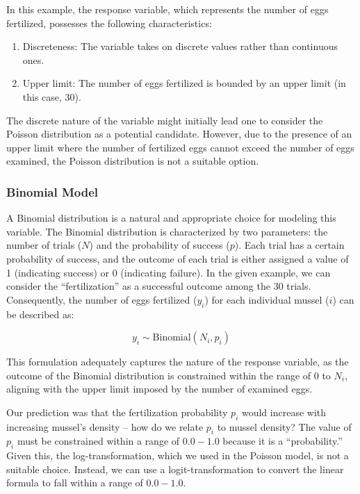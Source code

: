 \documentclass[
]{article}
\begin{document}
In this example, the response variable, which represents the number of eggs fertilized, possesses the following characteristics:

\begin{enumerate}
\def\labelenumi{\arabic{enumi}.}
\item
  Discreteness: The variable takes on discrete values rather than continuous ones.
\item
  Upper limit: The number of eggs fertilized is bounded by an upper limit (in this case, 30).
\end{enumerate}

The discrete nature of the variable might initially lead one to consider the Poisson distribution as a potential candidate. However, due to the presence of an upper limit where the number of fertilized eggs cannot exceed the number of eggs examined, the Poisson distribution is not a suitable option.

\hypertarget{binomial-model}{%
\subsubsection{Binomial Model}\label{binomial-model}}

A Binomial distribution is a natural and appropriate choice for modeling this variable. The Binomial distribution is characterized by two parameters: the number of trials (\(N\)) and the probability of success (\(p\)). Each trial has a certain probability of success, and the outcome of each trial is either assigned a value of 1 (indicating success) or 0 (indicating failure). In the given example, we can consider the ``fertilization'' as a successful outcome among the 30 trials. Consequently, the number of eggs fertilized (\(y_i\)) for each individual mussel (\(i\)) can be described as:

\[
y_i \sim \text{Binomial}(N_i, p_i)
\]

This formulation adequately captures the nature of the response variable, as the outcome of the Binomial distribution is constrained within the range of \(0\) to \(N_i\), aligning with the upper limit imposed by the number of examined eggs.

Our prediction was that the fertilization probability \(p_i\) would increase with increasing mussel's density -- how do we relate \(p_i\) to mussel density? The value of \(p_i\) must be constrained within a range of \(0.0-1.0\) because it is a ``probability.'' Given this, the log-transformation, which we used in the Poisson model, is not a suitable choice. Instead, we can use a logit-transformation to convert the linear formula to fall within a range of \(0.0 - 1.0\).
\end{document}
